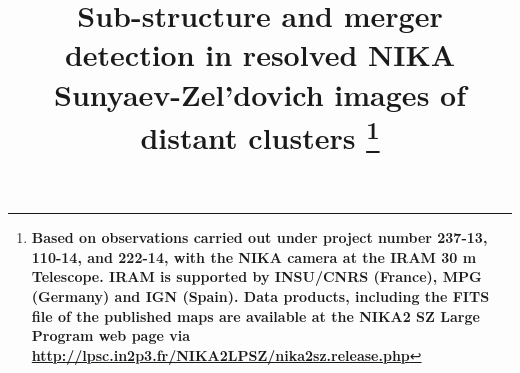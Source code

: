 \documentclass[twocolumn,traditabstract]{aa}
\begin{document}
\title{Sub-structure and merger detection in resolved NIKA Sunyaev-Zel'dovich images of distant clusters \thanks{{\bf Based on observations carried out under project number 237-13, 110-14, and 222-14, with the NIKA camera at the IRAM 30 m Telescope. IRAM is supported by INSU/CNRS (France), MPG (Germany) and IGN (Spain). Data products, including the FITS file of the published maps are available at the NIKA2 SZ Large Program web page via \url{http://lpsc.in2p3.fr/NIKA2LPSZ/nika2sz.release.php}}}}


\end{document}
